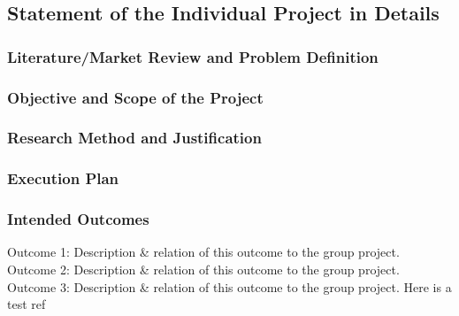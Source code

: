 \subsection{Statement of the Individual Project in Details}

\subsubsection{Literature/Market Review and Problem Definition}

\subsubsection{Objective and Scope of the Project}

\subsubsection{Research Method and Justification}

\subsubsection{Execution Plan}

\subsubsection{Intended Outcomes}
Outcome 1: Description \& relation of this outcome to the group project. 
\\%
Outcome 2: Description \& relation of this outcome to the group project. 
\\%
Outcome 3: Description \& relation of this outcome to the group project. Here is a test ref ~\cite{testbib}